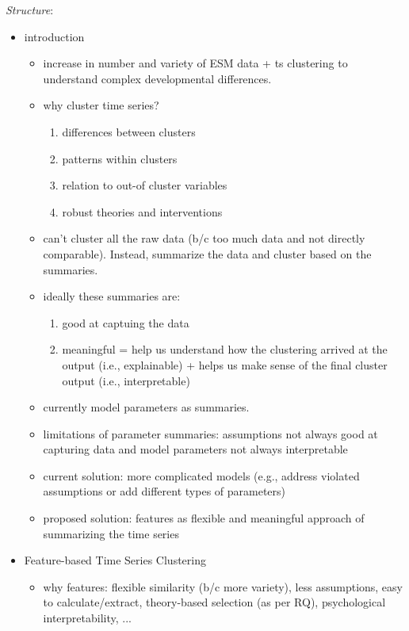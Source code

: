 \documentclass[man, 12pt, a4paper, mask, floatsintext]{apa7}
\theoremstyle{break}
\theoremstyle{plain}
\begin{document}
\begin{mdframed}[style=mdfbox]
\noindent\center\textit{Structure}:
\begin{itemize}[nosep]
    \item introduction
    \begin{itemize}[nosep]
        \item increase in number and variety of ESM data + ts clustering to understand complex developmental differences.
        \item why cluster time series? 
        \begin{enumerate}[nosep]
            \item differences between clusters
            \item patterns within clusters
            \item relation to out-of cluster variables
            \item robust theories and interventions
        \end{enumerate}
        \item can't cluster all the raw data (b/c too much data and not directly comparable). Instead, summarize the data and cluster based on the summaries.
        \item ideally these summaries are:
        \begin{enumerate}[nosep]
            \item good at captuing the data
            \item meaningful = help us understand how the clustering arrived at the output (i.e., explainable) + helps us make sense of the final cluster output (i.e., interpretable)
        \end{enumerate}
        \item currently model parameters as summaries.
        \item limitations of parameter summaries: assumptions not always good at capturing data and model parameters not always interpretable
        \item current solution: more complicated models (e.g., address violated assumptions or add different types of parameters)
        \item proposed solution: features as flexible and meaningful approach of summarizing the time series
    \end{itemize}
    \item Feature-based Time Series Clustering
    \begin{itemize}[nosep]
        \item why features: flexible similarity (b/c more variety), less assumptions, easy to calculate/extract, theory-based selection (as per RQ), psychological interpretability, ...

\end{itemize}
\end{itemize}
\end{mdframed}
\end{document}
